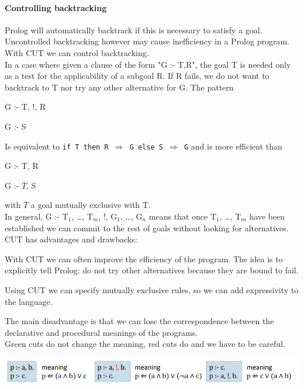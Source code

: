 \documentclass[10pt]{report}
\begin{document}
\paragraph{Controlling backtracking} Prolog will automatically backtrack if this is necessary to satisfy a goal. Uncontrolled backtracking however may cause inefficiency in a Prolog program. With CUT we can control backtracking.\\
In a case where given a clause of the form "G :- T,R", the goal T is needed only as a test for the applicability of a subgoal R. If R fails, we do not want to backtrack to T nor try any other alternative for G. The pattern \begin{list}{}{}
	\item G :- T, !, R
	\item G :- S
\end{list}
Is equivalent to \texttt{if T then R $\Rightarrow$ G else S $\Rightarrow$ G} and is more efficient than\begin{list}{}{}
	\item G :- T, R
	\item G :- $\overline{T}$, S
\end{list}
with $\overline{T}$ a goal mutually exclusive with T.\\
In general, G :- T$_1$, \ldots, T$_m$, !, G$_1$, \ldots, G$_n$ means that once T$_1$, \ldots, T$_m$ have been established we can commit to the rest of goals without looking for alternatives.\\
CUT has advantages and drawbacks:
\begin{list}{}{}
	\item With CUT we can often improve the efficiency of the program. The idea is to explicitly tell Prolog: do not try other alternatives because they are bound to fail.
	\item Using CUT we can specify mutually exclusive rules, so we can add expressivity to the language.
	\item The main disadvantage is that we can lose the correspondence between the declarative and procedural meanings of the programs.\\
	Green cuts do not change the meaning, red cuts do and we have to be careful.
	\begin{center}
		\includegraphics[scale=0.5]{20.png}
	\end{center}
\end{list}
\end{document}
